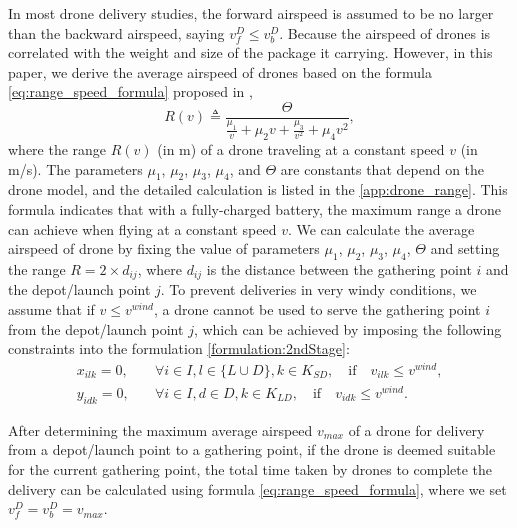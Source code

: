 \documentclass[preprint,review,11pt,authoryear]{elsarticle}
\begin{document}
In most drone delivery studies, the forward airspeed is assumed to be no larger than the backward airspeed, saying $v_f^D \leq v_b^D$. Because the airspeed of drones is correlated with the weight and size of the package it carrying. However, in this paper, we derive the average airspeed of drones based on the formula \ref{eq:range_speed_formula} proposed in \cite{dukkanci2021minimizing},
\begin{equation}
    R(v) \triangleq \frac{\Theta}{\frac{\mu_1}{v} + \mu_2 v + \frac{\mu_3}{v^2} + \mu_4 v^2}, \label{eq:range_speed_formula}
\end{equation}
where the range $R(v)$ (in m) of a drone traveling at a constant speed $v$ (in m/s). The parameters $\mu_1$, $\mu_2$, $\mu_3$, $\mu_4$, and $\Theta$ are constants that depend on the drone model, and the detailed calculation is listed in the \ref{app:drone_range}. This formula indicates that with a fully-charged battery, the maximum range a drone can achieve when flying at a constant speed $v$. We can calculate the average airspeed of drone by fixing the value of parameters $\mu_1$, $\mu_2$, $\mu_3$, $\mu_4$, $\Theta$ and setting the range $R = 2 \times d_{ij}$, where $d_{ij}$ is the distance between the gathering point $i$ and the depot/launch point $j$. To prevent deliveries in very windy conditions, we assume that if $v \leq v^{wind}$, a drone cannot be used to serve the gathering point $i$ from the depot/launch point $j$, which can be achieved by imposing the following constraints into the formulation \ref{formulation:2ndStage}:
\begin{subequations}
    \begin{align}
      x_{ilk} = 0, \quad &\forall i \in I, l \in \{L\cup D\}, k \in K_{SD}, \quad  \text{if} \quad v_{ilk} \leq v^{wind}, \label{constraint:SD_wind_speed_constraint} \\
      y_{idk} = 0, \quad &\forall i \in I, d \in D, k \in K_{LD}, \quad  \text{if} \quad v_{idk} \leq v^{wind}. \label{constraint:LD_wind_speed_constraint}
    \end{align}
\end{subequations}

After determining the maximum average airspeed $v_{max}$ of a drone for delivery from a depot/launch point to a gathering point,  if the drone is deemed suitable for the current gathering point, the total time taken by drones to complete the delivery can be calculated using formula \eqref{eq:range_speed_formula}, where we set $v_f^D = v_b^D = v_{max}$. 
\end{document}
